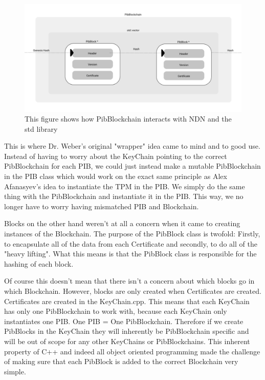 \begin{figure}
\includegraphics[width=6in]{pibblockchain.png}
\caption{This figure shows how PibBlockchain interacts with NDN and the std library}
\end{figure}

This is where Dr. Weber's original "wrapper" idea came to mind and to good use. Instead of having to worry about the KeyChain pointing to the correct PibBlockchain for each PIB, we could just instead make a mutable PibBlockchain in the PIB class which would work on the exact same principle as Alex Afanasyev's idea to instantiate the TPM in the PIB. We simply do the same thing with the PibBlockchain and instantiate it in the PIB. This way, we no longer have to worry having mismatched PIB and Blockchain. 

Blocks on the other hand weren't at all a concern when it came to creating instances of the Blockchain. The purpose of the PibBlock class is twofold: Firstly, to encapsulate all of the data from each Certificate and secondly, to do all of the "heavy lifting". What this means is that the PibBlock class is responsible for the hashing of each block. 

Of course this doesn't mean that there isn't a concern about which blocks go in which Blockchain. However, blocks are only created when Certificates are created. Certificates are created in the KeyChain.cpp. This means that each KeyChain has only one PibBlockchain to work with, because each KeyChain only instantiates one PIB. One PIB = One PibBlockchain. Therefore if we create PibBlocks in the KeyChain they will inherently be PibBlockchain specific and will be out of scope for any other KeyChains or PibBlockchains. This inherent property of C++ and indeed all object oriented programming made the challenge of making sure that each PibBlock is added to the correct Blockchain very simple.

